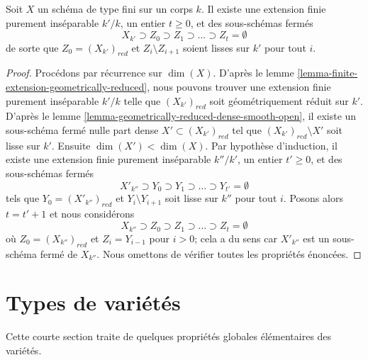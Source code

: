 \begin{lemma}
\label{lemma-smooth-stratification}
 Soit $X$ un schéma de type fini sur un corps $k$.
Il existe une extension finie purement inséparable $k'/k$,
un entier $t \geq 0$, et des sous-schémas fermés 
$$
X_{k'} \supset Z_0 \supset Z_1 \supset \ldots \supset Z_t = \emptyset
$$
 de sorte que $Z_0 = (X_{k'})_{red}$ et $Z_i \setminus Z_{i + 1}$
 soient lisses sur $k'$ pour tout $i$. 
\end{lemma}

\begin{proof}
 Procédons par récurrence sur $\dim(X)$. D'après
le lemme \ref{lemma-finite-extension-geometrically-reduced},
nous pouvons trouver une extension finie purement inséparable $k'/k$
 telle que $(X_{k'})_{red}$ soit géométriquement réduit sur $k'$.
D'après le lemme \ref{lemma-geometrically-reduced-dense-smooth-open},
il existe un sous-schéma fermé nulle part dense $X' \subset (X_{k'})_{red}$
 tel que $(X_{k'})_{red} \setminus X'$ soit lisse sur $k'$.
Ensuite $\dim(X') < \dim(X)$. Par hypothèse d'induction, il existe
une extension finie purement inséparable $k''/k'$,
un entier $t' \geq 0$, et des sous-schémas fermés 
$$
X'_{k''} \supset Y_0 \supset Y_1 \supset \ldots \supset Y_{t'} = \emptyset
$$
 tels que $Y_0 = (X'_{k''})_{red}$ et $Y_i \setminus Y_{i + 1}$
 soit lisse sur $k''$ pour tout $i$. Posons alors $t = t' + 1$
 et nous considérons 
$$
X_{k''} \supset Z_0 \supset Z_1 \supset \ldots \supset Z_t = \emptyset
$$
 où $Z_0 = (X_{k''})_{red}$ et $Z_i = Y_{i - 1}$ pour $i > 0$;
cela a du sens car $X'_{k''}$ est un sous-schéma fermé de $X_{k''}$.
Nous omettons de vérifier toutes les propriétés énoncées. 
\end{proof}




\section{Types de variétés} 
\label{section-types}

\noindent
 Cette courte section traite de quelques propriétés globales élémentaires des variétés.

